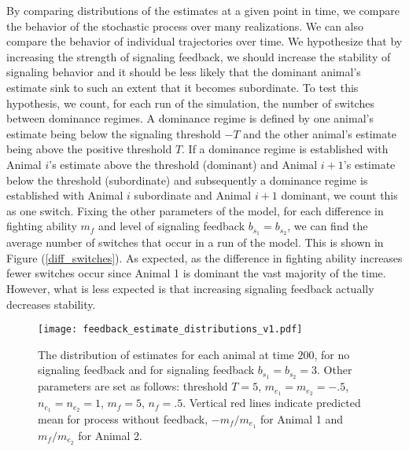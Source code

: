\documentclass{article}
\begin{document}
By comparing distributions of the estimates at a given point in time, we compare the behavior of the stochastic process over many realizations.  We can also compare the behavior of individual trajectories over time.  We hypothesize that by increasing the strength of signaling feedback, we should increase the stability of signaling behavior and it should be less likely that the dominant animal's estimate sink to such an extent that it becomes subordinate.  To test this hypothesis, we count, for each run of the simulation, the number of switches between dominance regimes.  A dominance regime is defined by one animal's estimate being below the signaling threshold $-T$ and the other animal's estimate being above the positive threshold $T$.  If a dominance regime is established with Animal $i$'s estimate above the threshold (dominant) and Animal $i+1$'s estimate below the threshold (subordinate) and subsequently a dominance regime is established with Animal $i$ subordinate and Animal $i+1$ dominant, we count this as one switch.  Fixing the other parameters of the model, for each difference in fighting ability $m_f$ and level of signaling feedback $b_{s_1}=b_{s_2}$, we can find the average number of switches that occur in a run of the model.  This is shown in Figure (\ref{diff_switches}).  As expected, as the difference in fighting ability increases fewer switches occur since Animal 1 is dominant the vast majority of the time.  However, what is less expected is that increasing signaling feedback actually decreases stability.
  
\begin{figure}
\begin{center}
\texttt{[image: feedback\_estimate\_distributions\_v1.pdf]}
\end{center}
\caption{\label{diff_dists} The distribution of estimates for each animal at time $200$, for no signaling feedback and for signaling feedback $b_{s_1}=b_{s_2}=3$.  Other parameters are set as follows: threshold $T=5$, $m_{e_1}=m_{e_2}=-.5$, $n_{e_1}=n_{e_2}=1$, $m_f=5$, $n_f=.5$. Vertical red lines indicate predicted mean for process without feedback, $-m_f/m_{e_1}$ for Animal 1 and $m_f/m_{e_2}$ for Animal 2. }
\end{figure}
\end{document}
